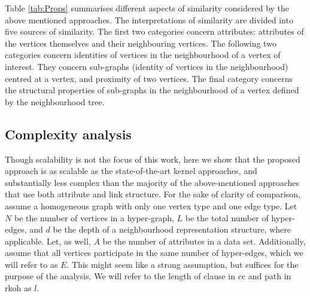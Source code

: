 Table \ref{tab:Props} summarises different aspects of similarity considered by the above mentioned approaches.
The interpretations of similarity are divided into five sources of similarity.
The first two categories concern attributes: attributes of the vertices themselves and their neighbouring vertices.
The following two categories concern identities of vertices in the neighbourhood of a vertex of interest.
They concern sub-graphs (identity of vertices in the neighbourhood) centred at a vertex, and proximity of two vertices.
The final category concerns the structural properties of sub-graphs in the neighbourhood of a vertex defined by the neighbourhood tree.


\subsection{Complexity analysis}

Though scalability is not the focus of this work, here we show that the proposed approach is as scalable as the state-of-the-art kernel approaches, and substantially less complex than the majority of the above-mentioned approaches that use both attribute and link structure.
For the sake of clarity of comparison, assume a homogeneous graph with only one vertex type and one edge type.
Let $N$ be the number of vertices in a hyper-graph, $L$ be the total number of hyper-edges, and $d$ be the depth of a neighbourhood representation structure, where applicable.
Let, as well, $A$ be the number of attributes in a data set.
Additionally, assume that all vertices participate in the same number of hyper-edges, which we will refer to as $E$.
This might seem like a strong assumption, but suffices for the purpose of the analysis.
We will refer to the length of clause in \gls{cc} and path in \gls{rkoh} as $l$.



